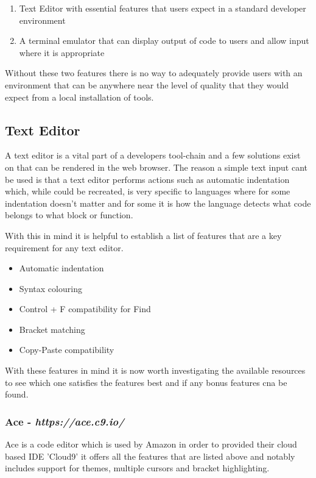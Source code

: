 \begin{enumerate}
    \item Text Editor with essential features that users expect in a standard developer environment
    \item A terminal emulator that can display output of code to users and allow input where it is appropriate
\end{enumerate}

Without these two features there is no way to adequately provide users with an environment that can be anywhere near the level of quality that they would expect from a local installation of tools.

\subsection{Text Editor}

A text editor is a vital part of a developers tool-chain and a few solutions exist on that can be rendered in the web browser. The reason a simple text input cant be used is that a text editor performs actions such as automatic indentation which, while could be recreated, is very specific to languages where for some indentation doesn't matter and for some it is how the language detects what code belongs to what block or function.

With this in mind it is helpful to establish a list of features that are a key requirement for any text editor.

\begin{itemize}
    \item Automatic indentation
    \item Syntax colouring 
    \item Control + F compatibility for Find
    \item Bracket matching
    \item Copy-Paste compatibility
\end{itemize}

With these features in mind it is now worth investigating the available resources to see which one satisfies the features best and if any bonus features cna be found.

\subsubsection{Ace - \textit{https://ace.c9.io/}}

Ace is a code editor which is used by Amazon in order to provided their cloud based IDE 'Cloud9' it offers all the features that are listed above and notably includes support for themes, multiple cursors and bracket highlighting.

